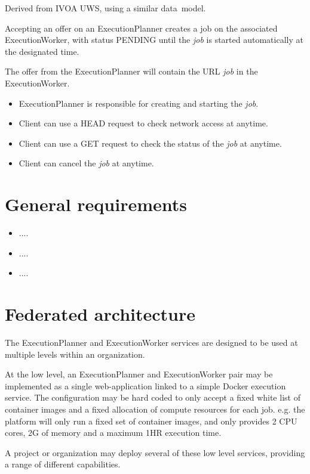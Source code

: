 \documentclass[11pt,a4paper]{ivoa}
\newcommand{\datamodel} {data~model}
\newcommand{\execplanner} {ExecutionPlanner}
\newcommand{\execworker} {ExecutionWorker}
\newcommand{\docker} {Docker}
\newcommand{\cpu} {CPU}
\newcommand{\job} {\textit{job}}
\begin{document}
Derived from IVOA UWS, using a similar \datamodel{}.

Accepting an offer on an \execplanner{} creates a job on the associated \execworker{},
with status PENDING until the \job{} is started automatically at the designated time.

The offer from the \execplanner{} will contain the URL \job{} in the \execworker{}.

\begin{itemize}
    \item \execplanner{} is responsible for creating and starting the \job{}.
    \item Client can use a HEAD request to check network access at anytime.
    \item Client can use a GET request to check the status of the \job{} at anytime.
    \item Client can cancel the \job{} at anytime.
\end{itemize}

\pagebreak

\section{General requirements}
\label{general-requirements}

\begin{itemize}
    \item ....
    \item ....
    \item ....
\end{itemize}


\section{Federated architecture}
\label{federation}

The \execplanner{} and \execworker{} services are designed to be used at multiple levels within an organization.

At the low level, an \execplanner{} and \execworker{} pair may be implemented as a
single web-application linked to a simple \docker{} execution service.
The configuration may be hard coded to only accept a fixed white list of container images
and a fixed allocation of compute resources for each job{}.
e.g. the platform will only run a fixed set of container images, and only provides 2 \cpu{} cores, 2G of memory and a maximum 1HR execution time.

A project or organization may deploy several of these low level services,
providing a range of different capabilities.
\end{document}
